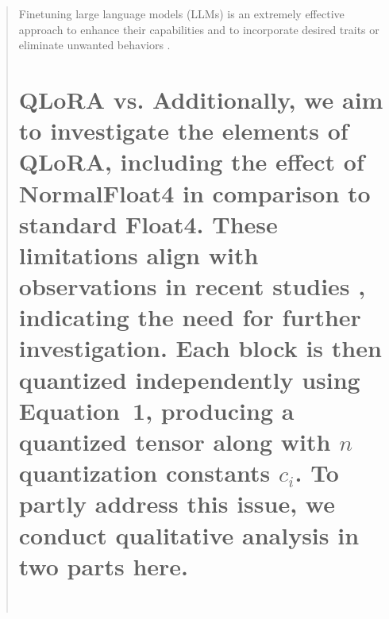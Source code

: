 \begin{quote}
Finetuning large language models (LLMs) is an extremely effective approach to enhance their capabilities \citep{min2021metaicl, wei2021finetuned, ouyang2022training, wang2022super, wang2022self, liu2022few} and to incorporate desired traits or eliminate unwanted behaviors \citep{ouyang2022training,askell2021general,bai2022training}. \section{QLoRA vs. Additionally, we aim to investigate the elements of QLoRA, including the effect of NormalFloat4 in comparison to standard Float4. These limitations align with observations in recent studies \cite{sap2022neural}, indicating the need for further investigation. Each block is then quantized independently using Equation~1, producing a quantized tensor along with $n$ quantization constants $c_i$. To partly address this issue, we conduct qualitative analysis in two parts here. \\ \\
}
\end{quote}
